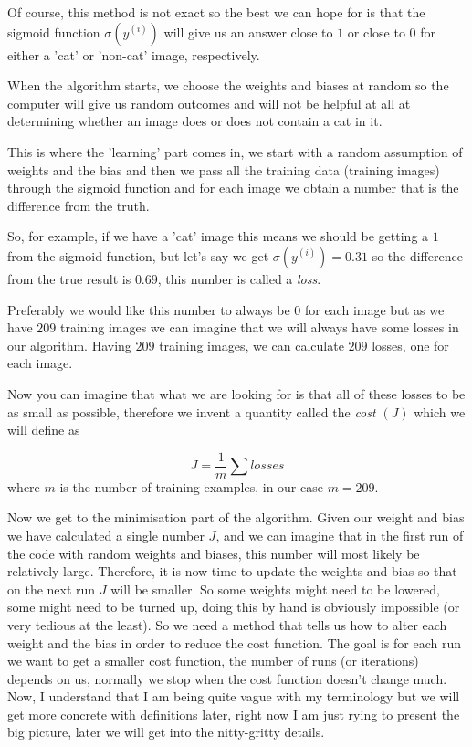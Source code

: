 Of course, this method is not exact so the best we can hope
for is that the sigmoid function $\sigma(y^{(i)})$ will give
us an answer close to $1$ or close to $0$ for either a 'cat'
or 'non-cat' image, respectively.

When the algorithm starts, we choose the weights and biases
at random so the computer will give us random outcomes and
will not be helpful at all at determining whether an image
does or does not contain a cat in it.

This is where the 'learning' part comes in, we start with a
random assumption of weights and the bias and then we pass
all the training data (training images) through the sigmoid
function and for each image we obtain a number that is the
difference from the truth.

So, for example, if we have a 'cat' image this means we
should be getting a $1$ from the sigmoid function, but let's
say we get $\sigma(y^{(i)})=0.31$ so the difference from the
true result is $0.69$, this number is called a
\textit{loss}. 

Preferably we would like this number to always be $0$ for
each image but as we have $209$ training images we can
imagine that we will always have some losses in our
algorithm. Having $209$ training images, we can calculate
$209$ losses, one for each image.

Now you can imagine that what we are looking for is that all
of these losses to be as small as possible, therefore we
invent a quantity called the \textit{cost} $(J)$ which we
will define as

\begin{equation}
    J = \frac{1}{m} \sum losses
\end{equation}
where $m$ is the number of training examples, in our case $m=209$.

Now we get to the minimisation part of the algorithm. Given
our weight and bias we have calculated a single number $J$,
and we can imagine that in the first run of the code with
random weights and biases, this number will most likely be
relatively large.  Therefore, it is now time to update the
weights and bias so that on the next run $J$ will be
smaller. So some weights might need to be lowered, some
might need to be turned up, doing this by hand is obviously
impossible (or very tedious at the least).  So we need a
method that tells us how to alter each weight and the bias
in order to reduce the cost function. The goal is for each
run we want to get a smaller cost function, the number of
runs (or iterations) depends on us, normally we stop when
the cost function doesn't change much. Now, I understand
that I am being quite vague with my terminology but we will
get more concrete with definitions later, right now I am
just rying to present the big picture, later we will get
into the nitty-gritty details.

